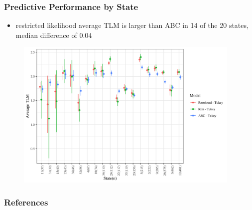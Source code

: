 \documentclass{beamer}
\begin{document}
\begin{frame}
	\frametitle{Predictive Performance by State}
\begin{itemize}
	\item restricted likelihood average TLM is larger than ABC in 14 of the 20 states, median difference of $0.04$
\end{itemize}
\begin{figure}[t]
	\centering
	\includegraphics[width=4.25in]{hier_ave_tlm_state.png}
	\label{fig:hierTLM}
\end{figure}

\end{frame}



\begin{frame}[t,allowframebreaks]
	\frametitle{References}
	\def\newblock{\hskip .11em plus .33em minus .07em} %
	
\end{frame}
	
\end{document}
